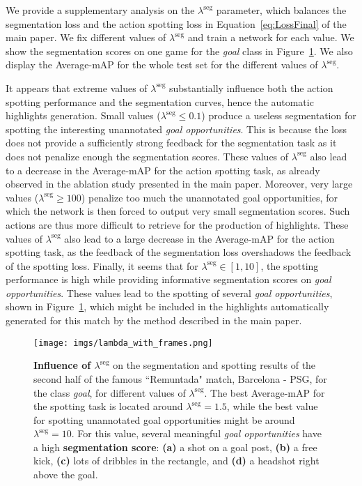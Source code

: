\documentclass[10pt,twocolumn,letterpaper]{article}
\begin{document}
 We provide a supplementary analysis on the $\lambda^\text{seg}$ parameter, which balances the segmentation loss and the action spotting loss in Equation~\ref{eq:LossFinal} of the main paper.
We fix different values of $\lambda^\text{seg}$ and train a network for each value. We show the segmentation scores on one game for the \emph{goal} class in Figure~\ref{fig:lambdaAnalysis}. We also display the Average-mAP for the whole test set for the different values of $\lambda^\text{seg}$.

It appears that extreme values of $\lambda^\text{seg}$ substantially influence both the action spotting performance and the segmentation curves, hence the automatic highlights generation. Small values (\ie $\lambda^\text{seg}\leq 0.1$) produce a useless segmentation for spotting the interesting unannotated \emph{goal opportunities}. This is because the loss does not provide a sufficiently strong feedback for the segmentation task as it does not penalize enough the segmentation scores. These values of $\lambda^\text{seg}$ also lead to a decrease in the Average-mAP for the action spotting task, as already observed in the ablation study presented in the main paper. Moreover, very large values ($\lambda^\text{seg}\geq 100$) penalize too much the unannotated goal opportunities, for which the network is then forced to output very small segmentation scores. Such actions are thus more difficult to retrieve for the production of highlights. These values of $\lambda^\text{seg}$ also lead to a large decrease in the Average-mAP for the action spotting task, as the feedback of the segmentation loss overshadows the feedback of the spotting loss. Finally, it seems that for $\lambda^\text{seg}\in[1,10]$, the spotting performance is high while providing informative segmentation scores on \emph{goal opportunities}. These values lead to the spotting of several \emph{goal opportunities}, shown in Figure~\ref{fig:lambdaAnalysis}, which might be included in the highlights automatically generated for this match by the method described in the main paper.


\begin{figure}
    \centering
    \texttt{[image: imgs/lambda\_with\_frames.png]}
    \caption{\textbf{Influence of $\lambda^\text{seg}$} on the segmentation and spotting results of the second half of the famous ``Remuntada" match, Barcelona - PSG, for the class \emph{goal}, for different values of $\lambda^\text{seg}$. The best Average-mAP for the spotting task is located around $\lambda^\text{seg}=1.5$, while the best value for spotting unannotated goal opportunities might be around $\lambda^\text{seg}=10$. For this value, several meaningful \emph{goal opportunities} have a high \textbf{\color{orange}segmentation score}: \textbf{(a)} a shot on a goal post, \textbf{(b)} a free kick, \textbf{(c)} lots of dribbles in the rectangle, and \textbf{(d)} a headshot right above the goal.
    }
    \label{fig:lambdaAnalysis}
\end{figure}
\end{document}
